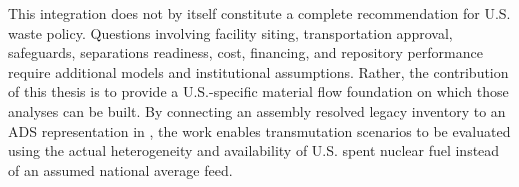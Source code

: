 This integration does not by itself constitute a complete recommendation for
U.S. waste policy. Questions involving facility siting, transportation
approval, safeguards, separations readiness, cost, financing, and repository
performance require additional models and institutional assumptions. Rather,
the contribution of this thesis is to provide a U.S.-specific material flow
foundation on which those analyses can be built. By connecting an
assembly resolved legacy inventory to an \gls{ADS} representation in \Cyclus, the
work enables transmutation scenarios to be evaluated using the actual
heterogeneity and availability of U.S. spent nuclear fuel instead of an
assumed national average feed.